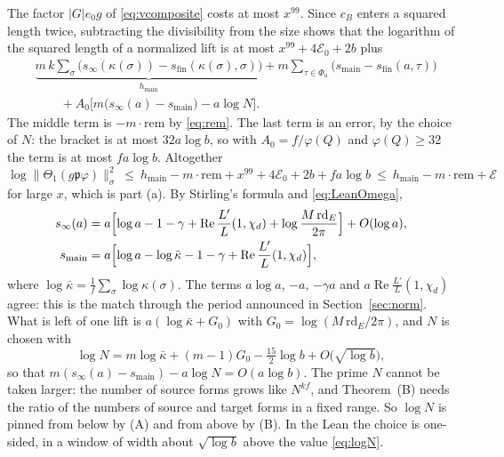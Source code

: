 \documentclass[11pt]{amsart}
\numberwithin{equation}{section}
\theoremstyle{definition}
\theoremstyle{remark}
\newcommand{\re}{\operatorname{Re}}
\begin{document}
The factor $|G|e_0g$ of \eqref{eq:vcomposite} costs at most $x^{99}$. Since $c_B$ enters a squared length twice, subtracting the divisibility from the size shows that the logarithm of the squared length of a normalized lift is at most $x^{99}+4\mathcal E_0+2b$ plus
\begin{equation}
\begin{split}
 &\underbrace{m\,k\sum_\sigma\bigl(s_\infty(\kappa(\sigma))-s_{\mathrm{fin}}(\kappa(\sigma),\sigma)\bigr)}_{h_{\mathrm{main}}}
 +m\sum_{\tau\in\Phi_a}\bigl(s_{\mathrm{main}}-s_{\mathrm{fin}}(a,\tau)\bigr)\\
 &\qquad+A_0\bigl[m\bigl(s_\infty(a)-s_{\mathrm{main}}\bigr)-a\log N\bigr].
\end{split}
\end{equation}
The middle term is $-m\cdot\mathrm{rem}$ by \eqref{eq:rem}. The last term is an error, by the choice of $N$: the bracket is at most $32a\log b$, so with $A_0=f/\varphi(Q)$ and $\varphi(Q)\ge32$ the term is at most $fa\log b$. Altogether
\begin{equation}\label{eq:Abudget}
 \log\bigl\|\Theta_1(g\mathfrak p\varphi)\bigr\|_\sigma^2\ \le\ h_{\mathrm{main}}-m\cdot\mathrm{rem}+x^{99}+4\mathcal E_0+2b+fa\log b\ \le\ h_{\mathrm{main}}-m\cdot\mathrm{rem}+\mathcal E
\end{equation}
for large $x$, which is part (a). By Stirling's formula and \eqref{eq:LeanOmega},
\begin{align}
 s_\infty(a)&=a\Bigl[\log a-1-\gamma+\re\frac{L'}{L}(1,\chi_d)+\log\frac{M\,\mathrm{rd}_E}{2\pi}\Bigr]+O(\log a),\\
 s_{\mathrm{main}}&=a\Bigl[\log a-\log\bar\kappa-1-\gamma+\re\frac{L'}{L}(1,\chi_d)\Bigr],
\end{align}
where $\log\bar\kappa=\frac1f\sum_\sigma\log\kappa(\sigma)$. The terms $a\log a$, $-a$, $-\gamma a$ and $a\re\frac{L'}L(1,\chi_d)$ agree: this is the match through the period announced in Section~\ref{sec:norm}. What is left of one lift is $a(\log\bar\kappa+G_0)$ with $G_0=\log(M\,\mathrm{rd}_E/2\pi)$, and $N$ is chosen with
\begin{equation}\label{eq:logN}
 \log N=m\log\bar\kappa+(m-1)G_0-\tfrac{15}2\log b+O\bigl(\sqrt{\log b}\bigr),
\end{equation}
so that $m(s_\infty(a)-s_{\mathrm{main}})-a\log N=O(a\log b)$. The prime $N$ cannot be taken larger: the number of source forms grows like $N^{kf}$, and Theorem~(B) needs the ratio of the numbers of source and target forms in a fixed range. So $\log N$ is pinned from below by (A) and from above by (B). In the Lean the choice is one-sided, in a window of width about $\sqrt{\log b}$ above the value \eqref{eq:logN}.
\end{document}
